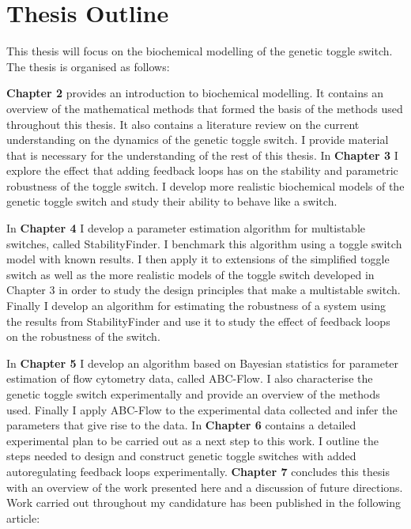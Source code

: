 
\section{Thesis Outline}

This thesis will focus on the biochemical modelling of the genetic toggle switch. The thesis is organised as follows:

\vskip 0.1in
\noindent \textbf{Chapter 2} provides an introduction to biochemical modelling. It contains an overview of the mathematical methods that formed the basis of the methods used throughout this thesis. It also contains a literature review on the current understanding on the dynamics of the genetic toggle switch. I provide material that is necessary for the understanding of the rest of this thesis. 
\vskip 0.1in
\noindent In \textbf{Chapter 3} I explore the effect that adding feedback loops has on the stability and parametric robustness of the toggle switch. I develop more realistic biochemical models of the genetic toggle switch and study their ability to behave like a switch.  

\vskip 0.1in
\noindent In \textbf{Chapter 4} I develop a parameter estimation algorithm for multistable switches, called StabilityFinder. I benchmark this algorithm using a toggle switch model with known results. I then apply it to extensions of the simplified toggle switch as well as the more realistic models of the toggle switch developed in Chapter 3 in order to study the design principles that make a multistable switch. Finally I develop an algorithm for estimating the robustness of a system using the results from StabilityFinder and use it to study the effect of feedback loops on the robustness of the switch.  

\vskip 0.1in
\noindent In \textbf{Chapter 5} I develop an algorithm based on Bayesian statistics for parameter estimation of flow cytometry data, called ABC-Flow. I also characterise the genetic toggle switch experimentally and provide an overview of the methods used. Finally I apply ABC-Flow to the experimental data collected and infer the parameters that give rise to the data.
\vskip 0.1in
\noindent In \textbf{Chapter 6} contains a detailed experimental plan to be carried out as a next step to this work. I outline the steps needed to design and construct genetic toggle switches with added autoregulating feedback loops experimentally. 
\vskip 0.1in
\noindent \textbf{Chapter 7} concludes this thesis with an overview of the work presented here and a discussion of future directions. 
\vskip 0.1in
\noindent Work carried out throughout my candidature has been published in the following article:

